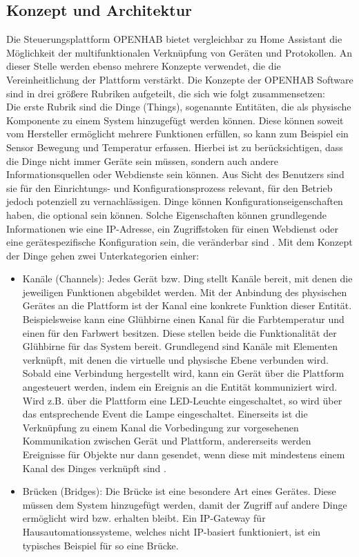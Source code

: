 \subsection{Konzept und Architektur}
    Die Steuerungsplattform \acs{OPENHAB} bietet vergleichbar zu Home Assistant die Möglichkeit der multifunktionalen Verknüpfung von 
    Geräten und Protokollen. An dieser Stelle werden ebenso mehrere Konzepte verwendet, die die Vereinheitlichung der Plattform 
    verstärkt. Die Konzepte der \acs{OPENHAB} Software sind in drei größere Rubriken aufgeteilt, die sich wie folgt zusammensetzen:
    \\
    \linebreak
    Die erste Rubrik sind die Dinge (Things), sogenannte Entitäten, die als physische Komponente zu einem System hinzugefügt werden können. 
    Diese können soweit vom Hersteller ermöglicht mehrere Funktionen erfüllen, so kann zum Beispiel ein Sensor Bewegung und Temperatur erfassen. 
    Hierbei ist zu berücksichtigen, dass die Dinge nicht 
    immer Geräte sein müssen, sondern auch andere Informationsquellen oder Webdienste sein können. 
    Aus Sicht des Benutzers sind sie für den Einrichtungs- und Konfigurationsprozess relevant, für den Betrieb 
    jedoch potenziell zu vernachlässigen. Dinge können Konfigurationseigenschaften haben, die optional sein 
    können. Solche Eigenschaften können grundlegende Informationen wie eine IP-Adresse, ein Zugriffstoken für einen Webdienst 
    oder eine gerätespezifische Konfiguration sein, die veränderbar sind \cite{openHAB-article}. Mit dem Konzept der Dinge 
    gehen zwei Unterkategorien einher:
    \begin{itemize}
        \item Kanäle (Channels): Jedes Gerät bzw. Ding stellt Kanäle bereit, mit denen die jeweiligen Funktionen abgebildet werden. 
        Mit der Anbindung des physischen Gerätes an die Plattform ist der Kanal eine konkrete Funktion dieser Entität. Beispielsweise 
        kann eine Glühbirne einen Kanal für die Farbtemperatur und einen für den Farbwert besitzen. Diese stellen beide die 
        Funktionalität der Glühbirne für das System bereit. Grundlegend sind Kanäle mit Elementen verknüpft, mit denen 
        die virtuelle und physische Ebene verbunden wird. Sobald eine Verbindung hergestellt wird, kann ein Gerät über die Plattform 
        angesteuert werden, indem ein Ereignis an die Entität kommuniziert wird. Wird z.B. über die Plattform eine LED-Leuchte eingeschaltet, so 
        wird über das entsprechende Event die Lampe eingeschaltet. Einerseits ist die Verknüpfung zu einem Kanal die Vorbedingung zur vorgesehenen 
        Kommunikation zwischen Gerät und Plattform, andererseits werden Ereignisse für Objekte nur dann gesendet, wenn diese 
        mit mindestens einem Kanal des Dinges verknüpft sind \cite{openHAB-article}.
        \item Brücken (Bridges): Die Brücke ist eine besondere Art eines Gerätes. Diese müssen dem System hinzugefügt werden, damit der 
        Zugriff auf andere Dinge ermöglicht wird bzw. erhalten bleibt. Ein IP-Gateway für Hausautomationssysteme, welches nicht 
        IP-basiert funktioniert, ist ein typisches Beispiel für so eine Brücke.
    \end{itemize}
